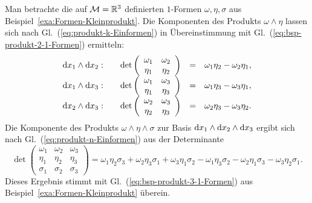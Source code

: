 \begin{example}
\label{exa:Produkt-1-Formen}Man betrachte die auf $\mathcal{M}={\mathbb{R}}^{3}$
definierten $1$-Formen $\omega,\eta,\sigma$ aus Beispiel~\ref{exa:Formen-Kleinprodukt}.
Die Komponenten des Produkts $\omega\wedge\eta$ lassen sich nach
Gl.~(\ref{eq:produkt-k-Einformen}) in Übereinstimmung mit Gl.~(\ref{eq:bsp-produkt-2-1-Formen})
ermitteln:
\[
\begin{array}{llcl}
{\mathrm{d}} x_{1}\wedge{\mathrm{d}} x_{2}:\quad & \det\left(\begin{array}{cc}
\omega_{1} & \omega_{2}\\
\eta_{1} & \eta_{2}
\end{array}\right) & = & \omega_{1}\eta_{2}-\omega_{2}\eta_{1},\\
{\mathrm{d}} x_{1}\wedge{\mathrm{d}} x_{3}: & \det\left(\begin{array}{cc}
\omega_{1} & \omega_{3}\\
\eta_{1} & \eta_{3}
\end{array}\right) & = & \omega_{1}\eta_{3}-\omega_{3}\eta_{1},\\
{\mathrm{d}} x_{2}\wedge{\mathrm{d}} x_{3}: & \det\left(\begin{array}{cc}
\omega_{2} & \omega_{3}\\
\eta_{2} & \eta_{3}
\end{array}\right) & = & \omega_{2}\eta_{3}-\omega_{3}\eta_{2}.
\end{array}
\]
Die Komponente des Produkts $\omega\wedge\eta\wedge\sigma$ zur Basis
${\mathrm{d}} x_{1}\wedge{\mathrm{d}} x_{2}\wedge{\mathrm{d}} x_{3}$ ergibt sich nach Gl.~(\ref{eq:produkt-n-Einformen})
aus der Determinante
\[
\det\left(\begin{array}{ccc}
\omega_{1} & \omega_{2} & \omega_{3}\\
\eta_{1} & \eta_{2} & \eta_{3}\\
\sigma_{1} & \sigma_{2} & \sigma_{3}
\end{array}\right)=\omega_{1}\eta_{2}\sigma_{3}+\omega_{2}\eta_{3}\sigma_{1}+\omega_{3}\eta_{1}\sigma_{2}-\omega_{1}\eta_{3}\sigma_{2}-\omega_{2}\eta_{1}\sigma_{3}-\omega_{3}\eta_{2}\sigma_{1}.
\]
Dieses Ergebnis stimmt mit Gl.~(\ref{eq:bsp-produkt-3-1-Formen})
aus Beispiel~\ref{exa:Formen-Kleinprodukt} überein.
\end{example}

